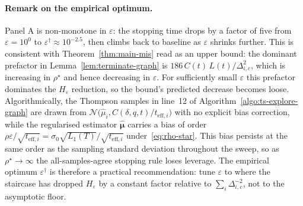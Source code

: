 \paragraph{Remark on the empirical optimum.}
Panel A is non-monotone in $\varepsilon$: the stopping time drops by a
factor of five from $\varepsilon=10^0$ to $\varepsilon^\dagger\approx
10^{-2.5}$, then climbs back to baseline as $\varepsilon$ shrinks further.
This is consistent with Theorem~\ref{thm:main-mis} read as an upper bound:
the dominant prefactor in Lemma~\ref{lem:terminate-graph} is
$186\,C(t)\,L(t)/\Delta_{i,c}^2$, which is increasing in $\rho^\star$ and
hence decreasing in $\varepsilon$. For sufficiently small $\varepsilon$
this prefactor dominates the $H_\varepsilon$ reduction, so the bound's
predicted decrease becomes loose. Algorithmically, the Thompson samples
in line~12 of Algorithm~\ref{algo:ts-explore-graph} are drawn from
$\mathcal{N}\!\bigl(\widehat\mu_i, C(\delta,q,t)/t_{\mathrm{eff},i}\bigr)$
with no explicit bias correction, while the regularised estimator
$\widehat{\bm\mu}$ carries a bias of order $\rho\varepsilon/\sqrt{t_{\mathrm{eff},i}}
=\sigma_0\sqrt{L_1(T)}/\sqrt{t_{\mathrm{eff},i}}$ under~\eqref{eq:rho-star}.
This bias persists at the same order as the sampling standard deviation
throughout the sweep, so as $\rho^\star\to\infty$ the all-samples-agree
stopping rule loses leverage. The empirical optimum $\varepsilon^\dagger$
is therefore a practical recommendation: tune $\varepsilon$ to where the
staircase has dropped $H_\varepsilon$ by a constant factor relative to
$\sum_i\Delta_{i,c}^{-2}$, not to the asymptotic floor.

